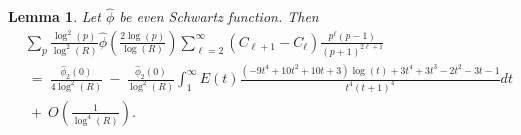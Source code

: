 \documentclass[11pt, reqno]{amsart}
\newtheorem{lemma}[theorem]{Lemma}
\theoremstyle{definition}
\theoremstyle{remark}
\numberwithin{equation}{section}
\renewcommand{\hat}{\widehat}
\begin{document}
\begin{lemma}
     Let $\hat\phi$ be even Schwartz function. Then
    \begin{equation}
    \begin{aligned}
        & \sum_{p} \frac{\log^2(p)}{\log^2(R)}\hat\phi\left(\frac{2\log(p)}{\log(R)}\right) \sum_{\ell=2}^\infty (C_{\ell+1}-C_\ell) \frac{p^\ell(p-1)}{(p+1)^{2\ell +1}}\\
        & \ = \ \frac{\hat\phi_2(0)}{4\log^2(R)}
        \ - \ \frac{\hat\phi_2(0)}{\log^2(R)}\int_1^\infty E(t)\frac{(-9t^4+10t^2+10t+3)\log(t)+3t^4+3t^3-2t^2-3t-1}{t^4(t+1)^4}dt\\
        & \ + \ O\left(\frac{1}{\log^4(R)}\right).
    \end{aligned}
    \end{equation}
\end{lemma}
\end{document}
